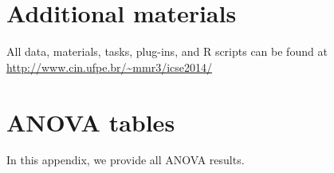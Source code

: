 \documentclass{sig-alternate}
\begin{document}


















%

%
%

\appendix

\section{Additional materials}

All  data, materials, tasks, plug-ins, and R scripts can be found at \url{http://www.cin.ufpe.br/~mmr3/icse2014/}

\section{ANOVA tables}

In this appendix, we provide all ANOVA results.
\end{document}
